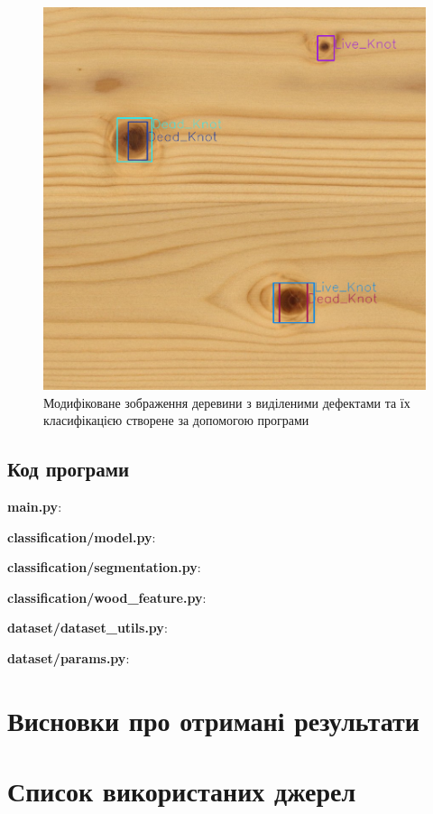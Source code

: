 \documentclass[oneside,14pt]{extarticle}
\begin{document}
\begin{figure}[H]
	\centering
	\includegraphics[scale=0.5]{2}
	\caption{Модифіковане зображення деревини з виділеними дефектами та їх класифікацією створене за допомогою програми}
\end{figure}

\subsection{Код програми}

\textbf{main.py}:
{\small}

\textbf{classification/model.py}:
{\small}

\textbf{classification/segmentation.py}:
{\small}

\textbf{classification/wood\_feature.py}:
{\small}

\textbf{dataset/dataset\_utils.py}:
{\small}

\textbf{dataset/params.py}:
{\small}

\section*{Висновки про отримані результати}

\section*{Список використаних джерел}
\end{document}

